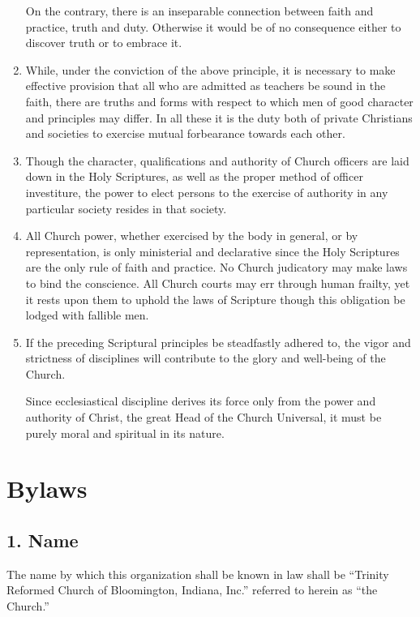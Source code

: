 \documentclass[
]{book}
\begin{document}
\begin{enumerate}
  On the contrary, there is an inseparable connection between faith and practice, truth and duty. Otherwise it would be of no consequence either to discover truth or to embrace it.
\item
  While, under the conviction of the above principle, it is necessary to make effective provision that all who are admitted as teachers be sound in the faith, there are truths and forms with respect to which men of good character and principles may differ. In all these it is the duty both of private Christians and societies to exercise mutual forbearance towards each other.
\item
  Though the character, qualifications and authority of Church officers are laid down in the Holy Scriptures, as well as the proper method of officer investiture, the power to elect persons to the exercise of authority in any particular society resides in that society.
\item
  All Church power, whether exercised by the body in general, or by representation, is only ministerial and declarative since the Holy Scriptures are the only rule of faith and practice. No Church judicatory may make laws to bind the conscience. All Church courts may err through human frailty, yet it rests upon them to uphold the laws of Scripture though this obligation be lodged with fallible men.
\item
  If the preceding Scriptural principles be steadfastly adhered to, the vigor and strictness of disciplines will contribute to the glory and well-being of the Church.

  Since ecclesiastical discipline derives its force only from the power and authority of Christ, the great Head of the Church Universal, it must be purely moral and spiritual in its nature.
\end{enumerate}

\hypertarget{bylaws}{%
\chapter{Bylaws}\label{bylaws}}

\hypertarget{name}{%
\section*{1. Name}\label{name}}

The name by which this organization shall be known in law shall be ``Trinity Reformed Church of Bloomington, Indiana, Inc.'' referred to herein as ``the Church.''
\end{document}
